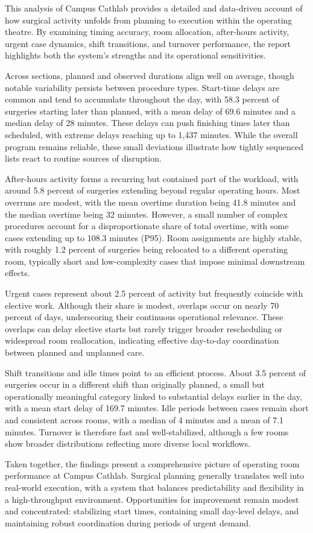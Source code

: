 \documentclass[
]{article}
\begin{document}
This analysis of Campus Cathlab provides a detailed and data-driven
account of how surgical activity unfolds from planning to execution
within the operating theatre. By examining timing accuracy, room
allocation, after-hours activity, urgent case dynamics, shift
transitions, and turnover performance, the report highlights both the
system's strengths and its operational sensitivities.

Across sections, planned and observed durations align well on average,
though notable variability persists between procedure types. Start-time
delays are common and tend to accumulate throughout the day, with 58.3
percent of surgeries starting later than planned, with a mean delay of
69.6 minutes and a median delay of 28 minutes. These delays can push
finishing times later than scheduled, with extreme delays reaching up to
1,437 minutes. While the overall program remains reliable, these small
deviations illustrate how tightly sequenced lists react to routine
sources of disruption.

After-hours activity forms a recurring but contained part of the
workload, with around 5.8 percent of surgeries extending beyond regular
operating hours. Most overruns are modest, with the mean overtime
duration being 41.8 minutes and the median overtime being 32 minutes.
However, a small number of complex procedures account for a
disproportionate share of total overtime, with some cases extending up
to 108.3 minutes (P95). Room assignments are highly stable, with roughly
1.2 percent of surgeries being relocated to a different operating room,
typically short and low-complexity cases that impose minimal downstream
effects.

Urgent cases represent about 2.5 percent of activity but frequently
coincide with elective work. Although their share is modest, overlaps
occur on nearly 70 percent of days, underscoring their continuous
operational relevance. These overlaps can delay elective starts but
rarely trigger broader rescheduling or widespread room reallocation,
indicating effective day-to-day coordination between planned and
unplanned care.

Shift transitions and idle times point to an efficient process. About
3.5 percent of surgeries occur in a different shift than originally
planned, a small but operationally meaningful category linked to
substantial delays earlier in the day, with a mean start delay of 169.7
minutes. Idle periods between cases remain short and consistent across
rooms, with a median of 4 minutes and a mean of 7.1 minutes. Turnover is
therefore fast and well-stabilized, although a few rooms show broader
distributions reflecting more diverse local workflows.

Taken together, the findings present a comprehensive picture of
operating room performance at Campus Cathlab. Surgical planning
generally translates well into real-world execution, with a system that
balances predictability and flexibility in a high-throughput
environment. Opportunities for improvement remain modest and
concentrated: stabilizing start times, containing small day-level
delays, and maintaining robust coordination during periods of urgent
demand.
\end{document}
